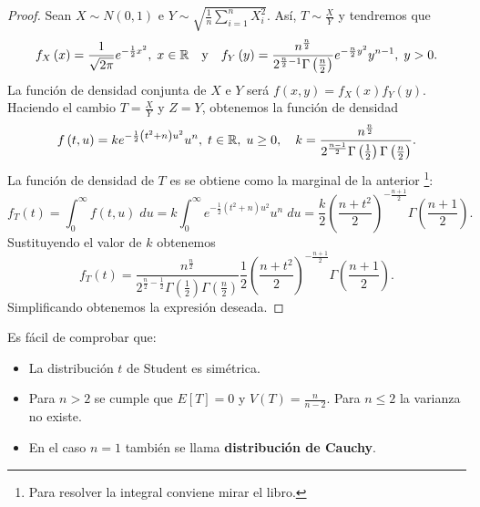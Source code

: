 \begin{proof} Sean $\displaystyle X \sim N\left(0,1\right) $ e $\displaystyle Y \sim \sqrt{\frac{1}{n}\sum^{n}_{i=1}X_{i}^{2}} $. Así, $\displaystyle T \sim \frac{X}{Y} $ y tendremos que 
\[f_{X}\left(x\right)=\frac{1}{\sqrt{2\pi }}e^{-\frac{1}{2}x^{2}}, \; x \in \mathbb{R} \quad \text{y} \quad f_{Y} \left(y\right)=\frac{n^{\frac{n}{2}}}{2^{\frac{n}{2}-1}\Gamma\left(\frac{n}{2}\right)}e^{-\frac{n}{2}y^{2}}y^{n-1}, \; y > 0 .\]
La función de densidad conjunta de $\displaystyle X $ e $\displaystyle Y $ será $\displaystyle f\left(x,y\right)=f_{X}\left(x\right)f_{Y}\left(y\right) $. Haciendo el cambio $\displaystyle T = \frac{X}{Y} $ y $\displaystyle Z = Y $, obtenemos la función de densidad
\[f\left(t,u\right)=ke^{-\frac{1}{2}\left(t ^{2}+n\right)u^{2}}u^{n}, \; t \in \mathbb{R}, \; u \geq 0 , \quad k = \frac{n^{\frac{n}{2}}}{2^{\frac{n-1}{2}}\Gamma\left(\frac{1}{2}\right)\Gamma\left(\frac{n}{2}\right)}.\]
La función de densidad de $\displaystyle T $ es se obtiene como la marginal de la anterior \footnote{Para resolver la integral conviene mirar el libro.}:
\[f_{T}\left(t\right)=\int^{\infty}_{0} f\left(t,u\right) \; du = k\int^{\infty}_{0} e^{-\frac{1}{2}\left(t ^{2}+n\right)u^{2}}u^{n} \; du = \frac{k}{2}\left(\frac{n+t ^{2}}{2}\right)^{-\frac{n+1}{2}}\Gamma\left(\frac{n+1}{2}\right).\]
Sustituyendo el valor de $\displaystyle k $ obtenemos 
\[f_{T}\left(t\right)=\frac{n^{\frac{n}{2}}}{2^{\frac{n}{2}-\frac{1}{2}}\Gamma\left(\frac{1}{2}\right)\Gamma\left(\frac{n}{2}\right)}\frac{1}{2}\left(\frac{n+t ^{2}}{2}\right)^{- \frac{n+1}{2}} \Gamma\left(\frac{n+1}{2}\right) .\]
Simplificando obtenemos la expresión deseada.
\end{proof}
\begin{observation} Es fácil de comprobar que:
	\begin{itemize}
	\item La distribución $\displaystyle t $ de Student es simétrica.
	\item Para $\displaystyle n > 2 $ se cumple que $\displaystyle E[T]=0 $ y $\displaystyle V\left(T\right)=\frac{n}{n-2} $. Para $\displaystyle n \leq 2 $ la varianza no existe. 
	\item En el caso $\displaystyle n = 1 $ también se llama \textbf{distribución de Cauchy}. 
	\end{itemize}
\end{observation}

